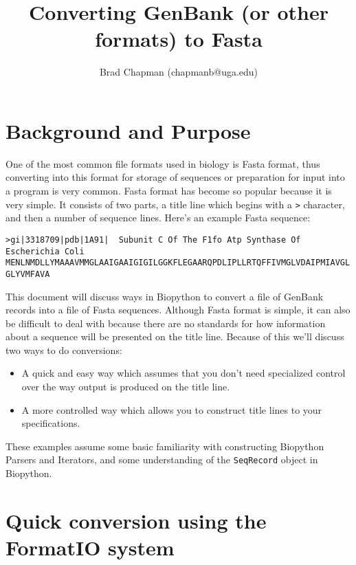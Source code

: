 \documentclass{article}
\begin{document}
\title{Converting GenBank (or other formats) to Fasta}
\author{Brad Chapman (chapmanb@uga.edu)}

\maketitle
\tableofcontents

\section{Background and Purpose}

One of the most common file formats used in biology is Fasta format,
thus converting into this format for storage of sequences or preparation for
input into a program is very common. Fasta format has become so
popular because it is very simple. It consists of two parts, a title
line which begins with a \verb|>| character, and then a number of
sequence lines. Here's an example Fasta sequence:

\begin{verbatim}
>gi|3318709|pdb|1A91|  Subunit C Of The F1fo Atp Synthase Of Escherichia Coli
MENLNMDLLYMAAAVMMGLAAIGAAIGIGILGGKFLEGAARQPDLIPLLRTQFFIVMGLVDAIPMIAVGL
GLYVMFAVA
\end{verbatim}

This document will discuss ways in Biopython to convert a file of
GenBank records into a file of Fasta sequences. Although Fasta format is
simple, it can also be difficult to deal with because there are no
standards for how information about a sequence will be presented on the
title line. Because of this we'll discuss two ways to do conversions:

\begin{itemize}
  \item A quick and easy way which assumes that you don't need specialized
    control over the way output is produced on the title line.
  \item A more controlled way which allows you to construct
    title lines to your specifications.
\end{itemize}

These examples assume some basic familiarity with constructing Biopython
Parsers and Iterators, and some understanding of the \verb|SeqRecord|
object in Biopython.

\section{Quick conversion using the FormatIO system}
\end{document}
